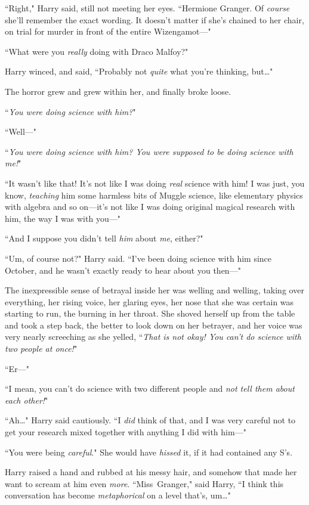``Right," Harry said, still not meeting her eyes. ``Hermione Granger. Of \emph{course} she'll remember the exact wording. It doesn't matter if she's chained to her chair, on trial for murder in front of the entire Wizengamot—"

``What were you \emph{really} doing with Draco Malfoy?"

Harry winced, and said, ``Probably not \emph{quite} what you're thinking, but…"

The horror grew and grew within her, and finally broke loose.

``\emph{You were doing \emph{science} with him?}"

``Well—"

``\emph{You were doing \emph{science} with him? You were supposed to be doing science with \emph{me}!}"

``It wasn't like that! It's not like I was doing \emph{real} science with him! I was just, you know, \emph{teaching} him some harmless bits of Muggle science, like elementary physics with algebra and so on—it's not like I was doing original magical research with him, the way I was with you—"

``And I suppose you didn't tell \emph{him} about \emph{me}, either?"

``Um, of course not?" Harry said. ``I've been doing science with him since October, and he wasn't exactly ready to hear about you then—"

The inexpressible sense of betrayal inside her was welling and welling, taking over everything, her rising voice, her glaring eyes, her nose that she was certain was starting to run, the burning in her throat. She shoved herself up from the table and took a step back, the better to look down on her betrayer, and her voice was very nearly screeching as she yelled, ``\emph{That is not okay! You can't do science with two people at once!}"

``Er—"

``I mean, you can't do science with two different people and \emph{not tell them about each other!}"

``Ah…" Harry said cautiously. ``I \emph{did} think of that, and I was very careful not to get your research mixed together with anything I did with him—"

``You were being \emph{careful}." She would have \emph{hissed} it, if it had contained any S's.

Harry raised a hand and rubbed at his messy hair, and somehow that made her want to scream at him even \emph{more}. ``Miss~Granger," said Harry, ``I think this conversation has become \emph{metaphorical} on a level that's, um…"

